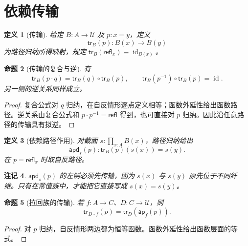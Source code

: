 \documentclass[12pt,oneside,openany,fontset=none]{ctexbook}
\theoremstyle{cn}
\newtheorem{definition}{定义}[chapter]
\newtheorem{proposition}[definition]{命题}
\newtheorem{remark}[definition]{注记}
\numberwithin{equation}{chapter}
\newcommand{\U}{\mathcal U}
\newcommand{\id}{\operatorname{id}}
\newcommand{\refl}{\mathsf{refl}}
\newcommand{\ap}{\mathsf{ap}}
\newcommand{\apd}{\mathsf{apd}}
\newcommand{\tr}{\mathsf{tr}}
\begin{document}
\section{依赖传输}
\begin{definition}[传输]
给定 $B:A\to\U$ 及 $p:x=y$，定义
\[
\tr_B(p):B(x)\to B(y)
\]
为路径归纳所得映射，规定 $\tr_B(\refl_x)\equiv\id_{B(x)}$。
\end{definition}
\begin{proposition}[传输的复合与逆]
有
\[
\tr_B(p\cdot q)=\tr_B(q)\circ\tr_B(p),
\qquad
\tr_B(p^{-1})\circ\tr_B(p)=\id.
\]
另一侧的逆关系同样成立。
\end{proposition}
\begin{proof}
复合公式对 $q$ 归纳，在自反情形逐点定义相等；函数外延性给出函数路径。逆关系由复合公式和 $p\cdot p^{-1}=\refl$ 得到，也可直接对 $p$ 归纳。因此沿任意路径的传输具有拟逆。
\end{proof}
\begin{definition}[依赖路径作用]
对截面 $s:\prod_{x:A}B(x)$，路径归纳给出
\[
\apd_s(p):\tr_B(p)(s(x))=s(y).
\]
在 $p=\refl_x$ 时取自反路径。
\end{definition}
\begin{remark}
$\apd_s(p)$ 的左侧必须先传输，因为 $s(x)$ 与 $s(y)$ 原先位于不同纤维。只有在常值族中，才能把它直接写成 $s(x)=s(y)$。
\end{remark}
\begin{proposition}[拉回族的传输]
若 $f:A\to C$、$D:C\to\U$，则
\[
\tr_{D\circ f}(p)=\tr_D(\ap_f(p)).
\]
\end{proposition}
\begin{proof}
对 $p$ 归纳，自反情形两边都为恒等函数。函数外延性给出函数层面的等式。
\end{proof}
\end{document}
